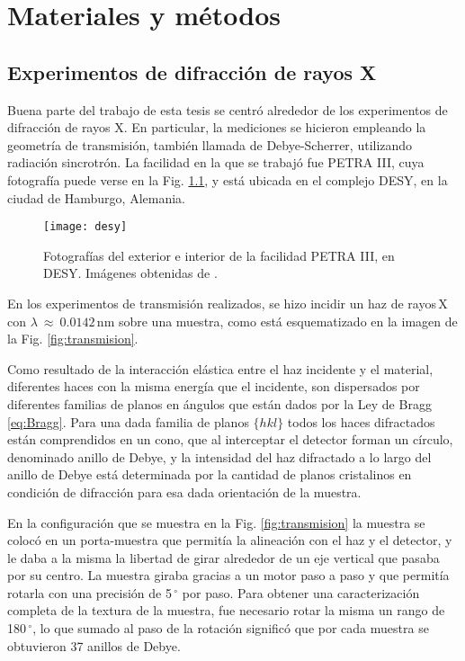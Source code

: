 \chapter{Materiales y métodos}\label{C:Materiales}
\graphicspath{{./figs/02_Mat/}}
\section{Experimentos de difracción de rayos X}\label{S:MatXRD}
Buena parte del trabajo de esta tesis se centró alrededor de los experimentos de difracción de rayos X.
En particular, la mediciones se hicieron empleando la geometría de transmisión, también llamada de Debye-Scherrer, utilizando radiación sincrotrón.
La facilidad en la que se trabajó fue PETRA III, cuya fotografía puede verse en la Fig. \ref{fig:desyfoto}, y está ubicada en el complejo DESY, en la ciudad de Hamburgo, Alemania\cite{desy}.

\begin{figure}[!htb] 
  \centering
  \texttt{[image: desy]}
  \caption{Fotografías del exterior e interior de la facilidad PETRA III, en DESY. Imágenes obtenidas de \cite{desy}.}
  \label{fig:desyfoto}
\end{figure}

En los experimentos de transmisión realizados, se hizo incidir un haz de rayos\,X con $\lambda \ \approx \ 0.0142$\,nm sobre una muestra, como está esquematizado en la imagen de la Fig. \ref{fig:transmision}. 

Como resultado de la interacción elástica entre el haz incidente y el material, diferentes haces con la misma energía que el incidente, son dispersados por diferentes familias de planos en ángulos que están dados por la Ley de Bragg \ref{eq:Bragg}.
Para una dada familia de planos $\{hkl\}$ todos los haces difractados están comprendidos en un cono, que al interceptar el detector forman un círculo, denominado anillo de Debye, y la intensidad del haz difractado a lo largo del anillo de Debye está determinada por la cantidad de planos cristalinos en condición de difracción para esa dada orientación de la muestra.

En la configuración que se muestra en la Fig. \ref{fig:transmision} la muestra se colocó en un porta-muestra que permitía la alineación con el haz y el detector, y le daba a la misma la libertad de girar alrededor de un eje vertical que pasaba por su centro.
La muestra giraba gracias a un motor paso a paso y que permitía rotarla con una precisión de 5\,$^{\circ}$ por paso.
Para obtener una caracterización completa de la textura de la muestra, fue necesario rotar la misma un rango de 180\,$^{\circ}$, lo que sumado al paso de la rotación significó que por cada muestra se obtuvieron 37 anillos de Debye.

